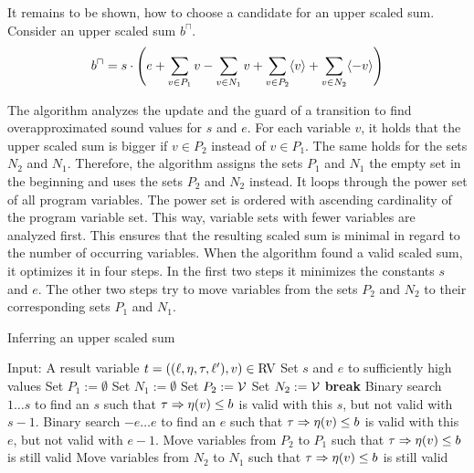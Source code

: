 It remains to be shown, how to choose a candidate for an upper scaled sum.
Consider an upper scaled sum $b^\sqcap$.
\[ b^\sqcap = s \cdot \left(
e
+ \sum_{v \in P_1} v
- \sum_{v \in N_1} v
+ \sum_{v \in P_2} \langle v\rangle
+ \sum_{v \in N_2} \langle-v\rangle
\right)
\]

The algorithm analyzes the update and the guard of a transition to find overapproximated sound values for $s$ and $e$.
For each variable $v$, it holds that the upper scaled sum is bigger if $v \in P_2$ instead of $v \in P_1$.
The same holds for the sets $N_2$ and $N_1$.
Therefore, the algorithm assigns the sets $P_1$ and $N_1$ the empty set in the beginning and uses the sets $P_2$ and $N_2$ instead. 
It loops through the power set of all program variables.
The power set is ordered with ascending cardinality of the program variable set.
This way, variable sets with fewer variables are analyzed first.
This ensures that the resulting scaled sum is minimal in regard to the number of occurring variables.
When the algorithm found a valid scaled sum, it optimizes it in four steps.
In the first two steps it minimizes the constants $s$ and $e$.
The other two steps try to move variables from the sets $P_2$ and $N_2$ to their corresponding sets $P_1$ and $N_1$.

\begin{algorithm}
\caption{Inferring an upper scaled sum}\label{ulsb_algorithm}
\begin{algorithmic}[1]
  \State Input: A result variable $t = ((\ell,\eta,\tau,\ell'),v) \in \text{RV}$
  \State Set $s$ and $e$ to sufficiently high values
  \State Set $P_1 := \emptyset$
  \State Set $N_1 := \emptyset$
    \State Set $P_2 := \mathcal{V}$
    \State Set $N_2 := \mathcal{V}$
      \State \textbf{break}
    \EndIf
  \EndFor
  \State Binary search $1 \dots s$ to find an $s$ such that $\tau \Rightarrow \eta(v) \leq b$ is valid with this $s$, but not valid with $s-1$.
  \State Binary search $-e \dots e$ to find an $e$ such that $\tau \Rightarrow \eta(v) \leq b$ is valid with this $e$, but not valid with $e-1$.
  \State Move variables from $P_2$ to $P_1$ such that $\tau \Rightarrow \eta(v) \leq b$ is still valid
  \State Move variables from $N_2$ to $N_1$ such that $\tau \Rightarrow \eta(v) \leq b$ is still valid
\end{algorithmic}
\end{algorithm}
